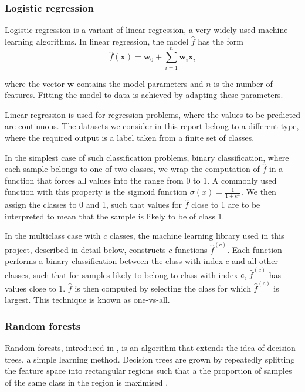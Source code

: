 \documentclass[a4paper,12pt,twoside,openright]{report}
\begin{document}
\subsubsection{Logistic regression}
Logistic regression is a variant of linear regression, a very widely used machine learning algorithms. In linear regression, the model $\hat{f}$ has the form
\begin{equation}
\hat{f}(\mathbf{x}) = \mathbf{w}_0 + \sum_{i=1}^n \mathbf{w}_i \mathbf{x}_i
\end{equation}

where the vector $\mathbf{w}$ contains the model parameters and $n$ is the number of features. Fitting the model to data is achieved by adapting these parameters.

Linear regression is used for regression problems, where the values to be predicted are continuous. The datasets we consider in this report belong to a different type, where the required output is a label taken from a finite set of classes.

In the simplest case of such classification problems, binary classification, where each sample belongs to one of two classes, we wrap the computation of $\hat{f}$ in a function that forces all values into the range from 0 to 1. A commonly used function with this property is the sigmoid function $\sigma(x) = \frac{1}{1+e^x}$. We then assign the classes to 0 and 1, such that values for $\hat{f}$ close to 1 are to be interpreted to mean that the sample is likely to be of class 1.

In the multiclass case with $c$ classes, the machine learning library used in this project, described in detail below, constructs $c$ functions $\hat{f}^{(c)}$. Each function performs a binary classification between the class with index $c$ and all other classes, such that for samples likely to belong to class with index $c$, $\hat{f}^{(c)}$ has values close to 1. $\hat{f}$ is then computed by selecting the class for which $\hat{f}^{(c)}$ is largest. This technique is known as one-vs-all.

\subsubsection{Random forests}
Random forests, introduced in \cite{rndforests}, is an algorithm that extends the idea of decision trees, a simple learning method. Decision trees are grown by repeatedly splitting the feature space into rectangular regions such that a the proportion of samples of the same class in the region is maximised \cite{james2014introduction}. 
\end{document}
